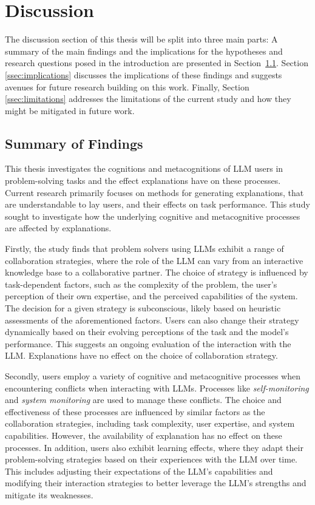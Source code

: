 \section{Discussion} \label{sec:discussion}

The discussion section of this thesis will be split into three main parts: A summary of the main findings and the implications for the hypotheses and research questions posed in the introduction are presented in Section~\ref{ssec:summary}. Section \ref{ssec:implications} discusses the implications of these findings and suggests avenues for future research building on this work. Finally, Section \ref{ssec:limitations} addresses the limitations of the current study and how they might be mitigated in future work.

\subsection{Summary of Findings} \label{ssec:summary}

This thesis investigates the cognitions and metacognitions of \ac{LLM} users in problem-solving tasks and the effect explanations have on these processes. Current research primarily focuses on methods for generating explanations, that are understandable to lay users, and their effects on task performance. This study sought to investigate how the underlying cognitive and metacognitive processes are affected by explanations.

Firstly, the study finds that problem solvers using \acp{LLM} exhibit a range of collaboration strategies, where the role of the \ac{LLM} can vary from an interactive knowledge base to a collaborative partner. The choice of strategy is influenced by task-dependent factors, such as the complexity of the problem, the user's perception of their own expertise, and the perceived capabilities of the system. The decision for a given strategy is subconscious, likely based on heuristic assessments of the aforementioned factors. Users can also change their strategy dynamically based on their evolving perceptions of the task and the model's performance. This suggests an ongoing evaluation of the interaction with the \ac{LLM}. Explanations have no effect on the choice of collaboration strategy.

Secondly, users employ a variety of cognitive and metacognitive processes when encountering conflicts when interacting with \acp{LLM}. Processes like \textit{self-monitoring} and \textit{system monitoring} are used to manage these conflicts. The choice and effectiveness of these processes are influenced by similar factors as the collaboration strategies, including task complexity, user expertise, and system capabilities. However, the availability of explanation has no effect on these processes. In addition, users also exhibit learning effects, where they adapt their problem-solving strategies based on their experiences with the \ac{LLM} over time. This includes adjusting their expectations of the \ac{LLM}'s capabilities and modifying their interaction strategies to better leverage the \ac{LLM}'s strengths and mitigate its weaknesses.

